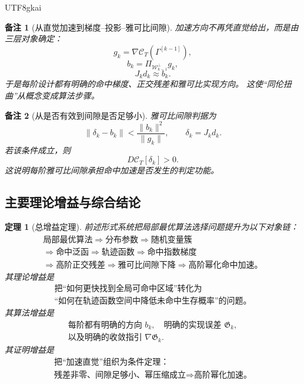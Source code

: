 \documentclass[12pt]{article}
\newtheorem{theorem}{定理}[section]
\newtheorem{remark}{备注}[section]
\begin{document}
\begin{CJK*}{UTF8}{gkai}
\begin{remark}[从直觉加速到梯度--投影--雅可比间隙]
加速方向不再凭直觉给出，而是由三层对象确定：
\[
  g_k=\nabla\mathcal C_T(\Gamma^{[k-1]}),
\]
\[
  b_k=\Pi_{\mathcal W_{k-1}^\perp}g_k,
\]
\[
  J_kd_k\approx b_k.
\]
于是每阶设计都有明确的命中梯度、正交残差和雅可比实现方向。
这使“同伦扭曲”从概念变成算法步骤。
\end{remark}

\begin{remark}[从是否有效到间隙是否足够小]
雅可比间隙判据为
\[
  \lVert\delta_k-b_k\rVert
  <
  \frac{\lVert b_k\rVert^2}{\lVert g_k\rVert},
  \qquad
  \delta_k=J_kd_k.
\]
若该条件成立，则
\[
  D\mathcal C_T[\delta_k]>0.
\]
这说明每阶雅可比间隙承担命中加速是否发生的判定功能。
\end{remark}

\subsection{主要理论增益与综合结论}
\label{subsec:tex55-gain-main-conclusions}

\begin{theorem}[总增益定理]
\label{thm:tex55-overall-gain-theorem}
前述形式系统把局部最优算法选择问题提升为以下对象链：
\[
  \boxed{
  \begin{gathered}
  \text{局部最优算法}
  \Longrightarrow
  \text{分布参数}
  \Longrightarrow
  \text{随机变量簇}\\
  \Longrightarrow
  \text{命中泛函}
  \Longrightarrow
  \text{轨迹函数}
  \Longrightarrow
  \text{命中指数梯度}\\
  \Longrightarrow
  \text{高阶正交残差}
  \Longrightarrow
  \text{雅可比间隙下降}
  \Longrightarrow
  \text{高阶幂化命中加速。}
  \end{gathered}
  }
\]
其理论增益是
\[
  \boxed{
  \begin{gathered}
  \text{把“如何更快找到全局可命中区域”转化为}\\
  \text{“如何在轨迹函数空间中降低未命中生存概率”的问题。}
  \end{gathered}
  }
\]
其算法增益是
\[
  \boxed{
  \begin{gathered}
  \text{每阶都有明确的方向 }b_k,\quad
  \text{明确的实现误差 }\mathfrak G_k,\\
  \text{以及明确的收敛指引 }\nabla\mathfrak G_k.
  \end{gathered}
  }
\]
其证明增益是
\[
  \boxed{
  \begin{gathered}
  \text{把“加速直觉”组织为条件定理：}\\
  \text{残差非零、间隙足够小、幂压缩成立}
  \Longrightarrow
  \text{高阶幂化加速。}
  \end{gathered}
  }
\]
\end{theorem}


\end{CJK*}
\end{document}
